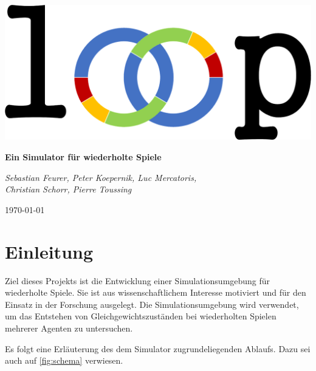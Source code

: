 \documentclass[parskip=full,11pt]{scrartcl}
\begin{document}

\begin{titlepage}
	\centering
	\vspace*{5cm}
	\includegraphics[width = 0.7\linewidth]{images/Logos/loop.png}\par
	{\huge\bfseries Ein Simulator für wiederholte Spiele\par}
	\vspace{2cm}
	{\Large\itshape Sebastian Feurer, Peter Koepernik, Luc Mercatoris,\\Christian Schorr, Pierre Toussing\par}
	\vfill
	{\large \today\par}
\end{titlepage}

\tableofcontents

\pagebreak

\section{Einleitung}
\vfill
Ziel dieses Projekts ist die Entwicklung einer Simulationsumgebung für wiederholte Spiele. Sie ist aus wissenschaftlichem Interesse motiviert und für den Einsatz in der Forschung ausgelegt. Die Simulationsumgebung wird verwendet, um das Entstehen von \Gls{Gleichgewicht}szuständen bei wiederholten Spielen mehrerer Agenten zu untersuchen.

Es folgt eine Erläuterung des dem Simulator zugrundeliegenden Ablaufs. Dazu sei auch auf \cref{fig:schema} verwiesen.
\end{document}
